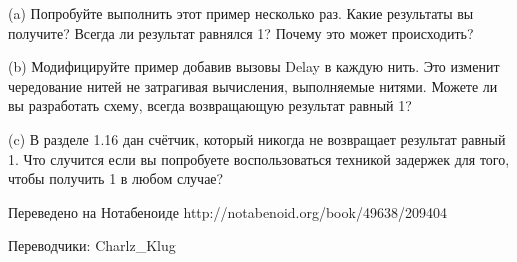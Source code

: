 (a) Попробуйте выполнить этот пример несколько раз. Какие результаты вы получите? Всегда ли результат равнялся 1? Почему это может происходить?

(b) Модифицируйте пример добавив вызовы Delay в каждую нить. Это изменит чередование нитей не затрагивая вычисления, выполняемые нитями. Можете ли вы разработать схему, всегда возвращающую результат равный 1?

(c) В разделе 1.16 дан счётчик, который никогда не возвращает результат равный 1. Что случится если вы попробуете воспользоваться техникой задержек для того, чтобы получить 1 в любом случае?

Переведено на Нотабеноиде
http://notabenoid.org/book/49638/209404

Переводчики: Charlz\_Klug

